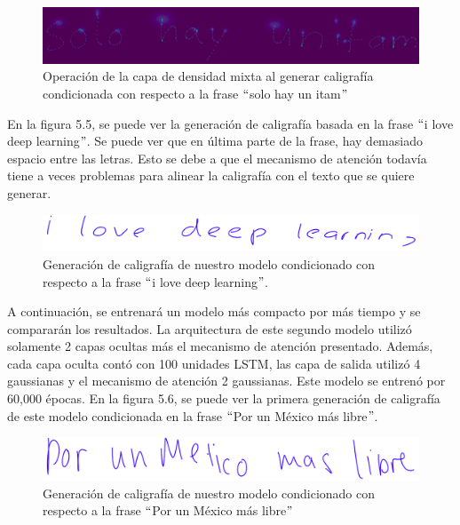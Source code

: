 \begin{figure}[h]
\begin{center}
\includegraphics[width=150mm, scale = 0.8]{./imag/solohay2.png}
\end{center}
\caption{Operación de la capa de densidad mixta al generar caligrafía condicionada con respecto a la frase $``$solo hay un itam$"$}
\end{figure}

 En la figura 5.5, se puede ver la generación de caligrafía basada en la frase $``$i love deep learning$"$. Se puede ver que en última parte de la frase, hay demasiado espacio entre las letras. Esto se debe a que el mecanismo de atención todavía tiene a veces problemas para alinear la caligrafía con el texto que se quiere generar. 


\begin{figure}[h]
\begin{center}
\includegraphics[width=150mm, scale = 0.8]{./imag/ilove.png}
\end{center}
\caption{Generación de caligrafía de nuestro modelo condicionado con respecto a la frase $``$i love deep learning$"$.}
\end{figure}

\vspace{1em}

A continuación, se entrenará un modelo más compacto por más tiempo y se compararán los resultados. La arquitectura de este segundo modelo utilizó solamente 2 capas ocultas más el mecanismo de atención presentado. Además, cada capa oculta contó con 100 unidades LSTM, las capa de salida utilizó 4 gaussianas y el mecanismo de atención 2 gaussianas. Este modelo se entrenó por 60,000 épocas. En la figura 5.6, se puede ver la primera generación de caligrafía de este modelo condicionada en la frase $``$Por un México más libre$"$.


\begin{figure}[h]
\begin{center}
\includegraphics[width=150mm, scale = 0.8]{./imag/por_un_mx_0.png}
\end{center}
\caption{Generación de caligrafía de nuestro modelo condicionado con respecto a la frase $``$Por un México más libre$"$}
\end{figure}

